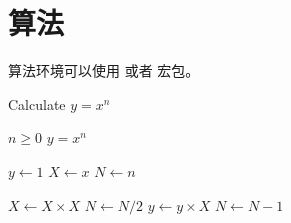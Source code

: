 \section{算法}

算法环境可以使用  或者  宏包。

\renewcommand{\algorithmicrequire}{\textbf{输入：}\unskip}
\renewcommand{\algorithmicensure}{\textbf{输出：}\unskip}

\begin{algorithm}
  \caption{Calculate $y = x^n$}
  \label{alg1}
  \small
  \begin{algorithmic}
    \REQUIRE $n \geq 0$
    \ENSURE $y = x^n$

    \STATE $y \leftarrow 1$
    \STATE $X \leftarrow x$
    \STATE $N \leftarrow n$

        \STATE $X \leftarrow X \times X$
        \STATE $N \leftarrow N / 2$
      \ELSE[$N$ is odd]
        \STATE $y \leftarrow y \times X$
        \STATE $N \leftarrow N - 1$
      \ENDIF
    \ENDWHILE
  \end{algorithmic}
\end{algorithm}

\fi